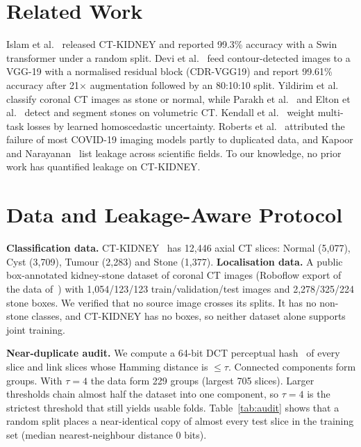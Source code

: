 \documentclass[conference]{IEEEtran}
\begin{document}
\section{Related Work}
Islam et al.~\cite{islam2022vision} released CT-KIDNEY and reported 99.3\% accuracy with a Swin transformer
under a random split. Devi et al.~\cite{devi2025cdr} feed contour-detected images to a VGG-19 with a normalised
residual block (CDR-VGG19) and report 99.61\% accuracy after 21$\times$ augmentation followed by an
80:10:10 split. Yildirim et al.~\cite{yildirim2021deep} classify coronal CT images as stone or normal, while
Parakh et al.~\cite{parakh2019urinary} and Elton et al.~\cite{elton2022deep} detect and segment stones on
volumetric CT. Kendall et al.~\cite{kendall2018multi} weight multi-task losses by learned homoscedastic
uncertainty. Roberts et al.~\cite{roberts2021pitfalls} attributed the failure of most COVID-19 imaging models
partly to duplicated data, and Kapoor and Narayanan~\cite{kapoor2023leakage} list leakage across scientific
fields. To our knowledge, no prior work has quantified leakage on CT-KIDNEY.

\section{Data and Leakage-Aware Protocol}\label{sec:protocol}
\textbf{Classification data.} CT-KIDNEY~\cite{islam2022vision} has 12,446 axial CT slices: Normal (5,077),
Cyst (3,709), Tumour (2,283) and Stone (1,377).
\textbf{Localisation data.} A public box-annotated kidney-stone dataset of coronal CT images (Roboflow export
of the data of~\cite{yildirim2021deep}) with 1,054/123/123 train/validation/test images and 2,278/325/224 stone
boxes. We verified that no source image crosses its splits. It has no non-stone classes, and CT-KIDNEY has no
boxes, so neither dataset alone supports joint training.

\textbf{Near-duplicate audit.} We compute a 64-bit DCT perceptual hash~\cite{zauner2010phash} of every slice
and link slices whose Hamming distance is $\le\tau$. Connected components form groups. With $\tau{=}4$ the data
form 229 groups (largest 705 slices). Larger thresholds chain almost half the dataset into one component, so
$\tau{=}4$ is the strictest threshold that still yields usable folds. Table~\ref{tab:audit} shows that a random
split places a near-identical copy of almost every test slice in the training set (median nearest-neighbour
distance 0 bits).
\end{document}
